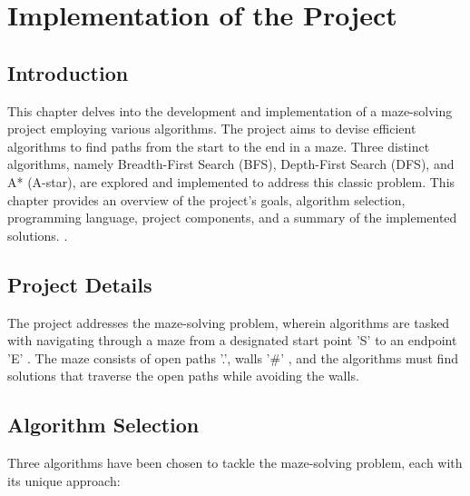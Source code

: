 \documentclass[12pt]{report}
\begin{document}




\newpage
\chapter{Implementation of the Project}

\section{Introduction}
This chapter delves into the development and implementation of a maze-solving project employing various algorithms. The project aims to devise efficient algorithms to find paths from the start to the end in a maze. Three distinct algorithms, namely Breadth-First Search (BFS), Depth-First Search (DFS), and A* (A-star), are explored and implemented to address this classic problem. This chapter provides an overview of the project's goals, algorithm selection, programming language, project components, and a summary of the implemented solutions.  \cite{9134044} \cite{DFS} \cite{A*}. 

\section{Project Details}
The project addresses the maze-solving problem, wherein algorithms are tasked with navigating through a maze from a designated start point  'S'  to an endpoint 'E' . The maze consists of open paths '.', walls  '#' , and the algorithms must find solutions that traverse the open paths while avoiding the walls.
\section{Algorithm Selection}
Three algorithms have been chosen to tackle the maze-solving problem, each with its unique approach:
\end{document}
